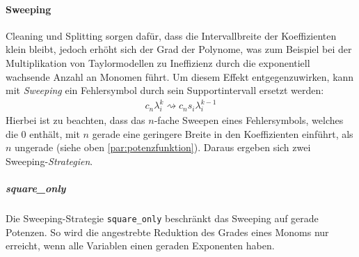 \paragraph{Sweeping}
Cleaning und Splitting sorgen dafür, dass die Intervallbreite der Koeffizienten klein bleibt, jedoch erhöht sich der Grad der Polynome, was zum Beispiel bei der Multiplikation von Taylormodellen zu Ineffizienz durch die exponentiell wachsende Anzahl an Monomen führt. Um diesem Effekt entgegenzuwirken, kann mit \textit{Sweeping} ein Fehlersymbol durch sein Supportintervall ersetzt werden:
\begin{align*}
 c_n \lambda_i^k \rightsquigarrow c_n s_i \lambda_i^{k-1}
\end{align*}
Hierbei ist zu beachten, dass das $n$-fache Sweepen eines Fehlersymbols, welches die 0 enthält, mit $n$ gerade eine geringere Breite in den Koeffizienten einführt, als $n$ ungerade (siehe oben \ref{par:potenzfunktion}). Daraus ergeben sich zwei Sweeping-\textit{Strategien}.

\subparagraph{square\_only}
Die Sweeping-Strategie \verb+square_only+ beschränkt das Sweeping auf gerade Potenzen. So wird die angestrebte Reduktion des Grades eines Monoms nur erreicht, wenn alle Variablen einen geraden Exponenten haben.


